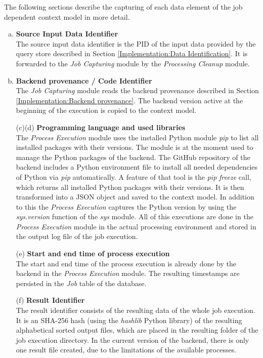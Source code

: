 \documentclass[draft,final]{vutinfth} %
\begin{document}
The following sections describe the capturing of each data element of the job dependent context model in more detail.
\begin{enumerate}[(a)]
\item \textbf{Source Input Data Identifier} \\
	The source input data identifier is the PID of the input data provided by the query store described in Section \ref{Implementation:Data Identification}. It is forwarded to the \textit{Job Capturing} module by the \textit{Processing Cleanup} module. 

\item \textbf{Backend provenance / Code Identifier} \\
	The \textit{Job Capturing} module reads the backend provenance described in Section \ref{Implementation:Backend provenance}. The backend version active at the beginning of the execution is copied to the context model.

\item[(c)(d)] \textbf{Programming language and used libraries} \\
	The \textit{Process Execution} module uses the installed Python module \textit{pip} to list all installed packages with their versions. The module is at the moment used to manage the Python packages of the backend. The GitHub repository of the backend includes a Python environment file to install all needed dependencies of Python via \textit{pip} automatically. A feature of that tool is the \textit{pip freeze} call, which returns all installed Python packages with their versions. It is then transformed into a JSON object and saved to the context model. In addition to this the \textit{Process Execution} captures the Python version by using the \textit{sys.version} function of the \textit{sys} module. All of this executions are done in the \textit{Process Execution} module in the actual processing environment and stored in the output log file of the job execution.    

\item[(e)] \textbf{Start and end time of process execution} \\
	The start and end time of the process execution is already done by the backend in the  \textit{Process Execution} module. The resulting timestamps are persisted in the \textit{Job} table of the database. 

\item[(f)] \textbf{Result Identifier} \\
	The result identifier consists of the resulting data of the whole job execution. It is an SHA-256 hash (using the \textit{hashlib} Python library) of the resulting alphabetical sorted output files, which are placed in the resulting folder of the job execution directory. In the current version of the backend, there is only one result file created, due to the limitations of the available processes.   
\end{enumerate}
\end{document}
